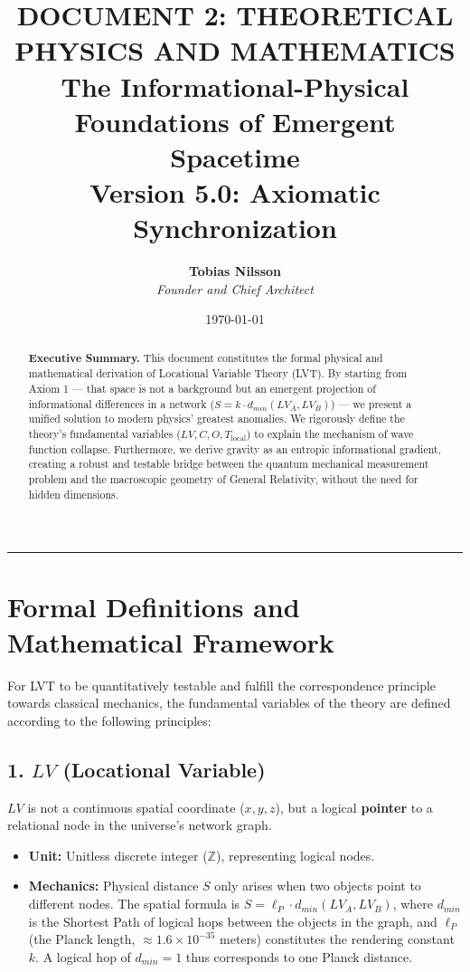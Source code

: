 \documentclass[12pt,a4paper]{article}
\title{\Huge
\textbf{DOCUMENT 2: THEORETICAL PHYSICS AND MATHEMATICS} \\ \large The Informational-Physical Foundations of Emergent Spacetime \\[0.5em]
\normalsize Version 5.0: Axiomatic Synchronization}
\author{\textbf{Tobias Nilsson} \\ \textit{Founder and Chief Architect}}
\date{\today}
\begin{document}
\maketitle

\vspace{-1em}
\begin{abstract}
\noindent
\textbf{Executive Summary.} This document constitutes the formal physical and mathematical derivation of Locational Variable Theory (LVT). By starting from Axiom 1 --- that space is not a background but an emergent projection of informational differences in a network ($S = k \cdot d_{min}(LV_A, LV_B)$) --- we present a unified solution to modern physics' greatest anomalies. We rigorously define the theory's fundamental variables ($LV, C, O, T_{\mathrm{local}}$) to explain the mechanism of wave function collapse. Furthermore, we derive gravity as an entropic informational gradient, creating a robust and testable bridge between the quantum mechanical measurement problem and the macroscopic geometry of General Relativity, without the need for hidden dimensions.
\end{abstract}
\vspace{-0.7em}

\vspace{0.5cm}
\hrule
\vspace{0.5cm}
\tableofcontents
\newpage

\section{Formal Definitions and Mathematical Framework}
For LVT to be quantitatively testable and fulfill the correspondence principle towards classical mechanics, the fundamental variables of the theory are defined according to the following principles:

\subsection{1. $LV$ (Locational Variable)}
$LV$ is not a continuous spatial coordinate ($x, y, z$), but a logical \textbf{pointer} to a relational node in the universe's network graph.
\begin{itemize}
    \item \textbf{Unit:} Unitless discrete integer ($\mathbb{Z}$), representing logical nodes.
    \item \textbf{Mechanics:} Physical distance $S$ only arises when two objects point to different nodes. The spatial formula is $S = \ell_P \cdot d_{min}(LV_A, LV_B)$, where $d_{min}$ is the Shortest Path of logical hops between the objects in the graph, and $\ell_P$ (the Planck length, $\approx 1.6 \times 10^{-35}$ meters) constitutes the rendering constant $k$. A logical hop of $d_{min} = 1$ thus corresponds to one Planck distance.
\end{itemize}
\end{document}
